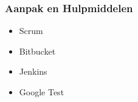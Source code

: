 \begin{frame}\frametitle{Aanpak en Hulpmiddelen}
	\begin{itemize}
		\item Scrum
		\item Bitbucket
		\item Jenkins
		\item Google Test
	\end{itemize}
\end{frame}